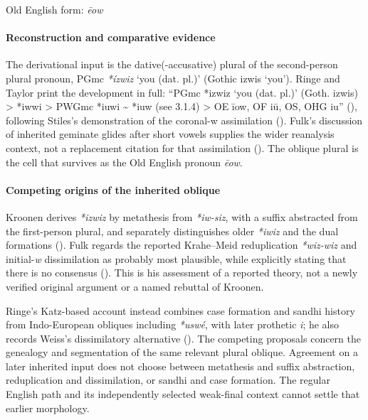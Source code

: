 \documentclass[
  british,
  a4paper,
]{article}
\providecommand{\Recon}[1]{\emph{*#1}}
\begin{document}
Old English form: \emph{ēow}

\paragraph{Reconstruction and comparative
evidence}\label{reconstruction-and-comparative-evidence-84}

The derivational input is the dative(-accusative) plural of the
second-person plural pronoun, PGmc \Recon{ízwiz} `you (dat. pl.)'
(Gothic {izwis} `you'). Ringe and Taylor print the development in full:
``PGmc *izwiz `you (dat. pl.)' (Goth. izwis) \textgreater{} *iwwi
\textgreater{} PWGmc *iuwi \textasciitilde{} *iuw (see 3.1.4)
\textgreater{} OE īow, OF iū, OS, OHG iu''
(),
following Stiles's demonstration of the coronal-w assimilation
(). Fulk's discussion of
inherited geminate glides after short vowels supplies the wider
reanalysis context, not a replacement citation for that assimilation
(). The oblique plural is the
cell that survives as the Old English pronoun \emph{ēow}.

\paragraph{Competing origins of the inherited
oblique}\label{competing-origins-of-the-inherited-oblique}

Kroonen derives \emph{*izwiz} by metathesis from \emph{*iw-siz}, with a
suffix abstracted from the first-person plural, and separately
distinguishes older \emph{*iwiz} and the dual formations
(). Fulk regards the
reported Krahe--Meid reduplication \emph{*wiz-wiz} and initial-\emph{w}
dissimilation as probably most plausible, while explicitly stating that
there is no consensus ().
This is his assessment of a reported theory, not a newly verified
original argument or a named rebuttal of Kroonen.

Ringe's Katz-based account instead combines case formation and sandhi
history from Indo-European obliques including \emph{*uswé}, with later
prothetic \emph{i}; he also records Weiss's dissimilatory alternative
(). The competing proposals
concern the genealogy and segmentation of the same relevant plural
oblique. Agreement on a later inherited input does not choose between
metathesis and suffix abstraction, reduplication and dissimilation, or
sandhi and case formation. The regular English path and its
independently selected weak-final context cannot settle that earlier
morphology.
\end{document}
